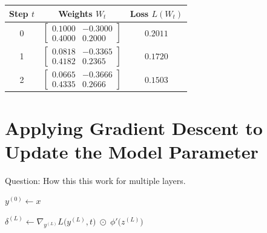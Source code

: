 \vspace{1em}

\begin{center}
	\begin{tabular}{@{}ccc@{}}
		\toprule
		\textbf{Step $t$} & \textbf{Weights $W_t$} & \textbf{Loss $L(W_t)$} \\
		\midrule
		0 & 
		$\begin{bmatrix} 0.1000 & -0.3000 \\ 0.4000 & 0.2000 \end{bmatrix}$ & 
		$0.2011$ \\
		1 & 
		$\begin{bmatrix} 0.0818 & -0.3365 \\ 0.4182 & 0.2365 \end{bmatrix}$ &
		$0.1720$ \\
		2 & 
		$\begin{bmatrix} 0.0665 & -0.3666 \\ 0.4335 & 0.2666 \end{bmatrix}$ &
		$0.1503$ \\
		\bottomrule
	\end{tabular}
\end{center}


\chapter{Applying Gradient Descent to Update the Model Parameter}
Question: How this this work for multiple layers.


\begin{algorithm}[H]
	\caption{Stochastic Gradient Descent for an $L$‑layer Neural Network}
	
	
	$y^{(0)} \gets x$
	
	$\delta^{(L)} \gets \nabla_{y^{(L)}}L\bigl(y^{(L)},t\bigr)\;\odot\;\phi'\bigl(z^{(L)}\bigr)$
	
	
\end{algorithm}
